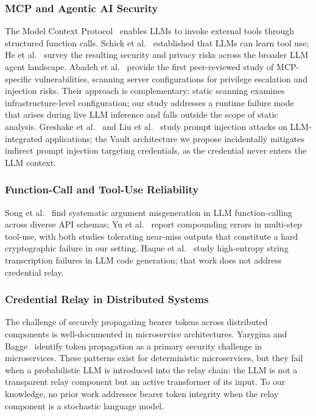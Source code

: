 \subsubsection*{MCP and Agentic AI Security}
The Model Context Protocol~\cite{anthropic2024mcp} enables LLMs to invoke
external tools through structured function calls. Schick et
al.~\cite{schick2023toolformer} established that LLMs can learn tool use; He et
al.~\cite{he2025security} survey the resulting security and privacy risks
across the broader LLM agent landscape. Abadeh et al.~\cite{abadeh2026mcp}
provide the first peer-reviewed study of MCP-specific vulnerabilities, scanning
server configurations for privilege escalation and injection risks. Their
approach is complementary: static scanning examines infrastructure-level
configuration; our study addresses a runtime failure mode that arises during
live LLM inference and falls outside the scope of static analysis. Greshake et
al.~\cite{greshake2023prompt} and Liu et al.~\cite{liu2024prompt} study prompt
injection attacks on LLM-integrated applications; the Vault architecture we
propose incidentally mitigates indirect prompt injection targeting credentials,
as the credential never enters the LLM context.

\subsubsection*{Function-Call and Tool-Use Reliability}
Song et al.~\cite{song2025callnavi} find systematic argument misgeneration
in LLM function-calling across diverse API schemas; Yu
et al.~\cite{yu2026wildtoolbench} report compounding errors in multi-step
tool-use, with both studies tolerating near-miss outputs that constitute a hard
cryptographic failure in our setting. Haque et al.~\cite{haque2026verbatim}
study high-entropy string transcription failures in LLM code generation; that
work does not address credential relay.

\subsubsection*{Credential Relay in Distributed Systems}
The challenge of securely propagating bearer tokens across distributed
components is well-documented in microservice architectures. Yarygina and
Bagge~\cite{yarygina2018microservice} identify token propagation as a primary
security challenge in microservices. These patterns exist for deterministic
microservices, but they fail when a probabilistic LLM is introduced into the
relay chain: the LLM is not a transparent relay component but an active
transformer of its input. To our knowledge, no prior work addresses bearer
token integrity when the relay component is a stochastic language model.

